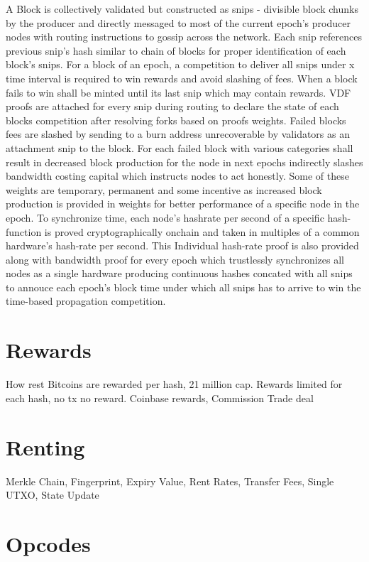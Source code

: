 \documentclass[a4paper,10pt]{article}
\begin{document}
A Block is collectively validated but constructed as snips - divisible block chunks by the producer and directly messaged to most of the current epoch's producer nodes with routing instructions to gossip across the network. Each snip references previous snip's hash similar to chain of blocks for proper identification of each block's snips. For a block of an epoch, a competition to deliver all snips under x time interval is required to win rewards and avoid slashing of fees. When a block fails to win shall be minted until its last snip which may contain rewards. VDF proofs are attached for every snip during routing to declare the state of each blocks competition after resolving forks based on proofs weights. Failed blocks fees are slashed by sending to a burn address unrecoverable by validators as an attachment snip to the block. For each failed block with various categories shall result in decreased block production for the node in next epochs indirectly slashes bandwidth costing capital which instructs nodes to act honestly. Some of these weights are temporary, permanent and some incentive as increased block production is provided in weights for better performance of a specific node in the epoch. To synchronize time, each node's hashrate per second of a specific hash-function is proved cryptographically onchain and taken in multiples of a common hardware's hash-rate per second. This Individual hash-rate proof is also provided along with bandwidth proof for every epoch which trustlessly synchronizes all nodes as a single hardware producing continuous hashes concated with all snips to annouce each epoch's block time under which all snips has to arrive to win the time-based propagation competition.

\section{Rewards}
How rest Bitcoins are rewarded per hash, 21 million cap. Rewards limited for each hash, no tx no reward. Coinbase rewards, Commission Trade deal

\section{Renting}
Merkle Chain, Fingerprint, Expiry Value, Rent Rates, Transfer Fees, Single UTXO, State Update

\section{Opcodes}
\end{document}
